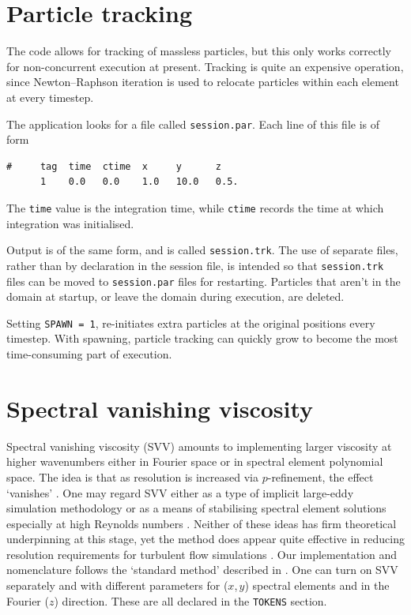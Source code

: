 \documentclass[11pt]{report}
\begin{document}
\section{Particle tracking}
\label{sec.particle}

The code allows for tracking of massless particles, but this only
works correctly for non-concurrent execution at present.  Tracking is
quite an expensive operation, since Newton--Raphson iteration is used
to relocate particles within each element at every timestep.

The application looks for a file called \verb+session.par+.  Each line
of this file is of form
\begin{verbatim}
#     tag  time  ctime  x     y      z
      1    0.0   0.0    1.0   10.0   0.5.
\end{verbatim}
The \verb+time+ value is the integration time, while \verb+ctime+
records the time at which integration was initialised.

Output is of the same form, and is called \verb+session.trk+.  The use
of separate files, rather than by declaration in the session file, is
intended so that \verb+session.trk+ files can be moved to
\verb+session.par+ files for restarting.  Particles that aren't in the
domain at startup, or leave the domain during execution, are deleted.

Setting \verb+SPAWN = 1+, re-initiates extra particles at the original
positions every timestep.  With spawning, particle tracking can
quickly grow to become the most time-consuming part of execution.

\section{Spectral vanishing viscosity}
\label{sec.svv}

Spectral vanishing viscosity (SVV) amounts to implementing larger
viscosity at higher wavenumbers either in Fourier space or in spectral
element polynomial space.  The idea is that as resolution is increased
via $p$-refinement, the effect `vanishes' \citep{tadmor89,mot93}.  One
may regard SVV either as a type of implicit large-eddy simulation
methodology \citep{pasquetti06} or as a means of stabilising spectral
element solutions especially at high Reynolds numbers
\citep{xupa04,kish06}. Neither of these ideas has firm theoretical
underpinning at this stage, yet the method does appear quite effective
in reducing resolution requirements for turbulent flow simulations
\citep{ksb12,cnbmo15}.  Our implementation and nomenclature follows
the `standard method' described in \citet{ksb12}.  One can turn on SVV
separately and with different parameters for ($x$,\,$y$) spectral
elements and in the Fourier ($z$) direction.  These are all declared
in the \verb+TOKENS+ section.
\end{document}

